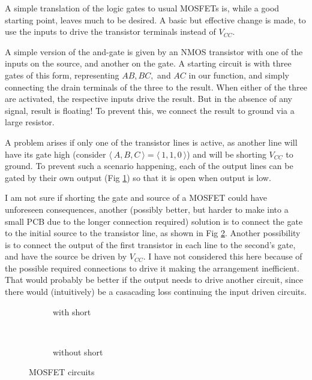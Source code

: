 
A simple translation of the logic gates to usual MOSFETs is,
while a good starting point, leaves much to be desired. 
A basic but effective change is made, to use the inputs to 
drive the transistor terminals instead of $V_{CC}$. 

A simple version of the and-gate is given by an NMOS transistor
with one of the inputs on the source, and another on the gate.
A starting circuit is with three gates of this form, representing
$AB, BC, $ and $AC$ in our function, and simply connecting the 
drain terminals of the three to the result. When either of the three
are activated, the respective inputs drive the result. But in the absence
of any signal, result is floating! To prevent this, we connect the result
to ground via a large resistor.

A problem arises if only one of the transistor lines is active, as
another line will have its gate high (consider $\langle~A, B, C~\rangle
= \langle~1, 1, 0~\rangle$) and will be shorting $V_{CC}$ to ground.
To prevent such a scenario happening, each of the output lines can be
gated by their own output (Fig \ref{subfig:fetcircloop}) so that it is open
when output is low. 

I am not sure if shorting the gate and source of a MOSFET could have
unforeseen consequences, another (possibly better, but harder to 
make into a small PCB due to the longer connection required) solution
is to connect the gate to the initial source to the transistor line, as 
shown in Fig \ref{subfig:fetcirc}. Another possibility is to connect the 
output of the first transistor in each line to the second's gate, and have the
source be driven by $V_{CC}$. I have not considered this here because of the 
possible required connections to drive it making the arrangement inefficient.
That would probably be better if the output needs to drive another circuit,
since there would (intuitively) be a casacading loss continuing the input driven
circuits.

\begin{figure}[ht]
    \centering
    \begin{subfigure}[bt]{0.7\textwidth}
        \centering
        \def\svgwidth{0.5\textwidth}
        \scalebox{1.1}{}
        \caption{with short}
    \label{subfig:fetcircloop}
    \end{subfigure}
    \\
    \begin{subfigure}[bt]{0.7\textwidth}
        \centering
        \def\svgwidth{0.5\textwidth}
        \scalebox{1.1}{}
        \caption{without short}
    \label{subfig:fetcirc}
    \end{subfigure}
    \caption{MOSFET circuits}
    \label{fig:fet}
\end{figure}

